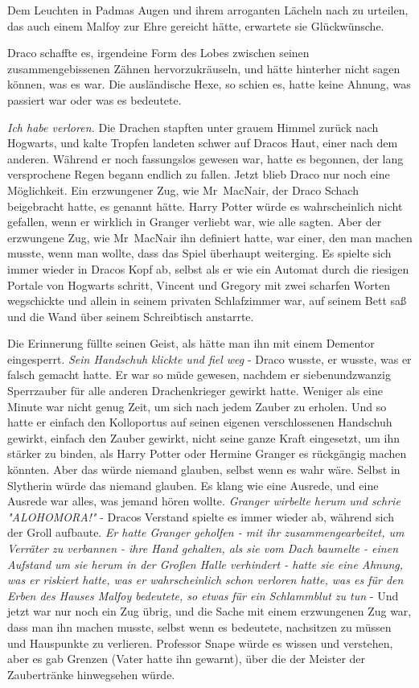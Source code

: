 {Dem Leuchten in Padmas Augen und ihrem arroganten Lächeln nach zu urteilen, das auch einem Malfoy zur Ehre gereicht hätte, erwartete sie Glückwünsche.

Draco schaffte es, irgendeine Form des Lobes zwischen seinen zusammengebissenen Zähnen hervorzukräuseln, und hätte hinterher nicht sagen können, was es war. Die ausländische Hexe, so schien es, hatte keine Ahnung, was passiert war oder was es bedeutete.

\emph{Ich habe verloren.} Die Drachen stapften unter grauem Himmel zurück nach Hogwarts, und kalte Tropfen landeten schwer auf Dracos Haut, einer nach dem anderen. Während er noch fassungslos gewesen war, hatte es begonnen, der lang versprochene Regen begann endlich zu fallen. Jetzt blieb Draco nur noch eine Möglichkeit. Ein erzwungener Zug, wie Mr~MacNair, der Draco Schach beigebracht hatte, es genannt hätte. Harry Potter würde es wahrscheinlich nicht gefallen, wenn er wirklich in Granger verliebt war, wie alle sagten. Aber der erzwungene Zug, wie Mr~MacNair ihn definiert hatte, war einer, den man machen musste, wenn man wollte, dass das Spiel überhaupt weiterging. Es spielte sich immer wieder in Dracos Kopf ab, selbst als er wie ein Automat durch die riesigen Portale von Hogwarts schritt, Vincent und Gregory mit zwei scharfen Worten wegschickte und allein in seinem privaten Schlafzimmer war, auf seinem Bett saß und die Wand über seinem Schreibtisch anstarrte.

Die Erinnerung füllte seinen Geist, als hätte man ihn mit einem Dementor eingesperrt. \emph{Sein Handschuh klickte und fiel weg} - Draco wusste, er wusste, was er falsch gemacht hatte. Er war so müde gewesen, nachdem er siebenundzwanzig Sperrzauber für alle anderen Drachenkrieger gewirkt hatte. Weniger als eine Minute war nicht genug Zeit, um sich nach jedem Zauber zu erholen. Und so hatte er einfach den Kolloportus auf seinen eigenen verschlossenen Handschuh gewirkt, einfach den Zauber gewirkt, nicht seine ganze Kraft eingesetzt, um ihn stärker zu binden, als Harry Potter oder Hermine Granger es rückgängig machen könnten. Aber das würde niemand glauben, selbst wenn es wahr wäre. Selbst in Slytherin würde das niemand glauben. Es klang wie eine Ausrede, und eine Ausrede war alles, was jemand hören wollte. \emph{Granger wirbelte herum und schrie "ALOHOMORA!"} - Dracos Verstand spielte es immer wieder ab, während sich der Groll aufbaute. \emph{Er hatte Granger geholfen - mit ihr zusammengearbeitet, um Verräter zu verbannen - ihre Hand gehalten, als sie vom Dach baumelte - einen Aufstand um sie herum in der Großen Halle verhindert - hatte sie eine Ahnung, was er riskiert hatte, was er wahrscheinlich schon verloren hatte, was es für den Erben des Hauses Malfoy bedeutete, so etwas} \emph{für ein Schlammblut zu tun} - Und jetzt war nur noch ein Zug übrig, und die Sache mit einem erzwungenen Zug war, dass man ihn machen musste, selbst wenn es bedeutete, nachsitzen zu müssen und Hauspunkte zu verlieren. Professor Snape würde es wissen und verstehen, aber es gab Grenzen (Vater hatte ihn gewarnt), über die der Meister der Zaubertränke hinwegsehen würde.

}
